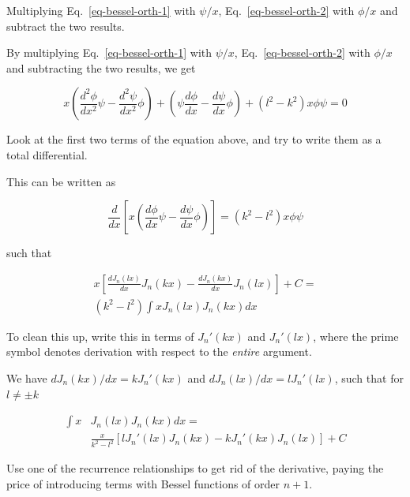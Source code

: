 \begin{cue}
Multiplying Eq.~\ref{eq-bessel-orth-1} with $\psi/x$, Eq.~\ref{eq-bessel-orth-2} with $\phi/x$ and subtract the two results.  
\end{cue}

By multiplying Eq.~\ref{eq-bessel-orth-1} with $\psi/x$, Eq.~\ref{eq-bessel-orth-2} with $\phi/x$ and subtracting the two results, we get

\begin{equation}
x \left( \frac{d^2 \phi}{dx^2}\psi - \frac{d^2 \psi}{dx^2} \phi \right) + \left(\psi \frac{d \phi}{dx}- \frac{d \psi}{dx}\phi\right) + \left(l^2 - k^2\right) x \phi \psi = 0
\end{equation}

\begin{cue}
Look at the first two terms of the equation above, and try to write them as a total differential. 
\end{cue}

This can be written as

\begin{equation}
\frac{d}{dx}\left[x \left( \frac{d \phi}{dx} \psi - \frac{d \psi}{dx} \phi\right)\right] = \left(k^2 - l^2\right) x \phi \psi
\end{equation}

such that

\begin{align}
x \left[{\frac{dJ_n(lx)}{dx}  J_n(kx) - \frac{dJ_n(kx)}{dx} J_n(lx)}\right] + C = \nonumber \\ \left(k^2 - l^2\right)\int x J_n(lx)J_n(kx)dx
\end{align}

\begin{cue}
To clean this up, write this in terms of $J_n'(kx)$ and  $J_n'(lx)$, where the prime symbol denotes derivation with respect to the \emph{entire} argument. 
\end{cue}

We have $dJ_n(kx)/dx = kJ_n'(kx)$ and $dJ_n(lx)/dx = lJ_n'(lx)$, such that for $l \ne \pm k$

\begin{align}
  \int x & J_n(lx)J_n(kx)dx = \nonumber \\
  & \frac{x}{k^2 - l^2} \left[{l J_n'(lx) J_n(kx) -  k J_n'(kx) J_n(lx)}\right] + C \label{eq-lommel-1}
\end{align} 

\begin{cue}
Use one of the recurrence relationships to get rid of the derivative, paying the price of introducing terms with Bessel functions of order $n+1$.
\end{cue}

